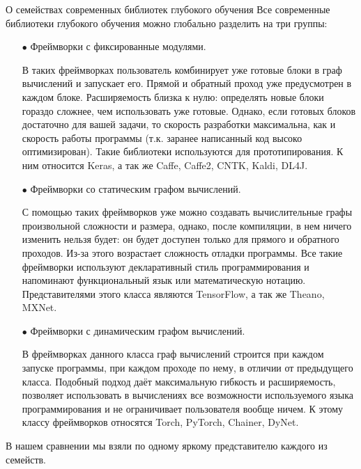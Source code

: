 \documentclass[aspectratio=169]{beamer}
\begin{document}
\begin{frame}{О семействах современных библиотек глубокого обучения}
Все современные библиотеки глубокого обучения можно глобально разделить на три группы:
\begin{itemize}
\item[$\bullet$] Фреймворки с фиксированные модулями.

В таких фреймворках пользователь комбинирует уже готовые блоки в граф вычислений и запускает его. Прямой и обратный проход уже предусмотрен в каждом блоке. Расширяемость близка к нулю: определять новые блоки гораздо сложнее, чем использовать уже готовые. Однако, если готовых блоков достаточно для вашей задачи, то скорость разработки максимальна, как и скорость работы программы (т.к. заранее написанный код высоко оптимизирован). Такие библиотеки используются для прототипирования. К ним относится Keras, а так же Caffe, Caffe2, CNTK, Kaldi, DL4J.\end{itemize}
\end{frame}

\begin{frame}
\begin{itemize}
\item[$\bullet$] Фреймворки со статическим графом вычислений.

С помощью таких фреймворков уже можно создавать вычислительные графы произвольной сложности и размера, однако, после компиляции, в нем ничего изменить нельзя будет: он будет доступен только для прямого и обратного проходов. Из-за этого возрастает сложность отладки программы. Все такие фреймворки используют декларативный стиль программирования и напоминают функциональный язык или математическую нотацию. Представителями этого класса являются TensorFlow, а так же Theano, MXNet.
\end{itemize}
\end{frame}

\begin{frame}
\begin{itemize}
\item[$\bullet$] Фреймворки с динамическим графом вычислений.

В фреймворках данного класса граф вычислений строится при каждом запуске программы, при каждом проходе по нему, в отличии от предыдущего класса. Подобный подход даёт максимальную гибкость и расширяемость, позволяет использовать в вычислениях все возможности используемого языка программирования и не ограничивает пользователя вообще ничем. К этому классу фреймворков относятся Torch, PyTorch, Chainer, DyNet.
\end{itemize}

В нашем сравнении мы взяли по одному яркому представителю каждого из семейств.
\end{frame}
\end{document}
